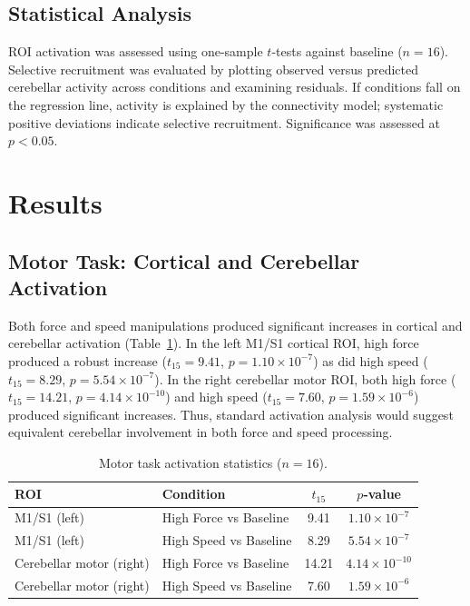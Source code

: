 \documentclass[11pt]{article}
\begin{document}
\subsection{Statistical Analysis}

ROI activation was assessed using one-sample $t$-tests against baseline ($n = 16$). Selective recruitment was evaluated by plotting observed versus predicted cerebellar activity across conditions and examining residuals. If conditions fall on the regression line, activity is explained by the connectivity model; systematic positive deviations indicate selective recruitment. Significance was assessed at $p < 0.05$.

\section{Results}

\subsection{Motor Task: Cortical and Cerebellar Activation}

Both force and speed manipulations produced significant increases in cortical and cerebellar activation (Table~\ref{tab:motoract}). In the left M1/S1 cortical ROI, high force produced a robust increase ($t_{15} = 9.41$, $p = 1.10 \times 10^{-7}$) as did high speed ($t_{15} = 8.29$, $p = 5.54 \times 10^{-7}$). In the right cerebellar motor ROI, both high force ($t_{15} = 14.21$, $p = 4.14 \times 10^{-10}$) and high speed ($t_{15} = 7.60$, $p = 1.59 \times 10^{-6}$) produced significant increases. Thus, standard activation analysis would suggest equivalent cerebellar involvement in both force and speed processing.

\begin{table}[h]
\centering
\caption{Motor task activation statistics ($n = 16$).}
\label{tab:motoract}
\begin{tabular}{llcc}
\toprule
ROI & Condition & $t_{15}$ & $p$-value \\
\midrule
M1/S1 (left) & High Force vs Baseline & 9.41 & $1.10 \times 10^{-7}$ \\
M1/S1 (left) & High Speed vs Baseline & 8.29 & $5.54 \times 10^{-7}$ \\
Cerebellar motor (right) & High Force vs Baseline & 14.21 & $4.14 \times 10^{-10}$ \\
Cerebellar motor (right) & High Speed vs Baseline & 7.60 & $1.59 \times 10^{-6}$ \\
\bottomrule
\end{tabular}
\end{table}
\end{document}
